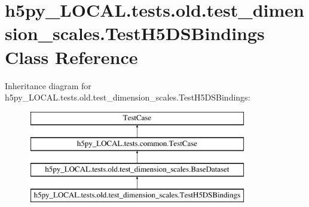 \hypertarget{classh5py__LOCAL_1_1tests_1_1old_1_1test__dimension__scales_1_1TestH5DSBindings}{}\section{h5py\+\_\+\+L\+O\+C\+A\+L.\+tests.\+old.\+test\+\_\+dimension\+\_\+scales.\+Test\+H5\+D\+S\+Bindings Class Reference}
\label{classh5py__LOCAL_1_1tests_1_1old_1_1test__dimension__scales_1_1TestH5DSBindings}
Inheritance diagram for h5py\+\_\+\+L\+O\+C\+A\+L.\+tests.\+old.\+test\+\_\+dimension\+\_\+scales.\+Test\+H5\+D\+S\+Bindings\+:\begin{figure}[H]
\begin{center}
\leavevmode
\includegraphics[height=4.000000cm]{classh5py__LOCAL_1_1tests_1_1old_1_1test__dimension__scales_1_1TestH5DSBindings}
\end{center}
\end{figure}
